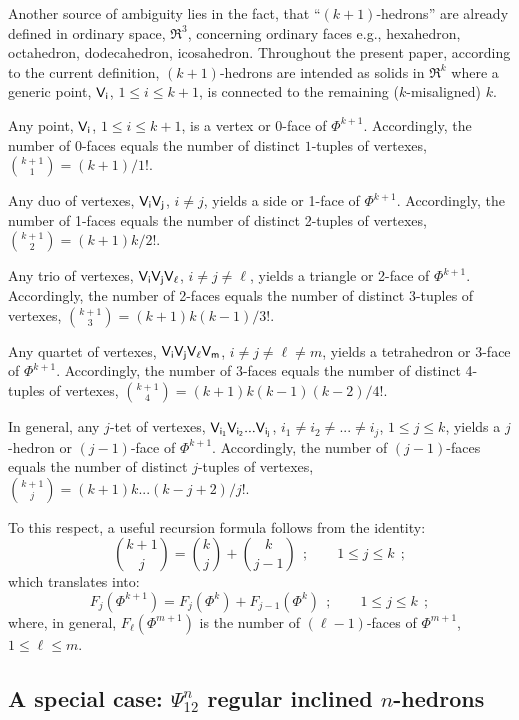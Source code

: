 \documentclass[12pt,a4paper]{article}
\begin{document}
Another source of ambiguity lies in the fact, that ``$(k+1)$-hedrons'' are
already defined in ordinary space, $\Re^3$, concerning ordinary faces e.g.,
hexahedron, octahedron, dodecahedron, icosahedron.   Throughout the present
paper, according to the current definition, $(k+1)$-hedrons are intended as
solids in $\Re^k$ where a generic point,  ${\sf V_i}$, $1\le i\le k+1$, is
connected to the remaining ($k$-misaligned) $k$.

Any point, ${\sf V_i}$, $1\le i\le k+1$, is a vertex or 0-face of
$\Phi^{k+1}$.   Accordingly, the number of $0$-faces equals
the number of distinct $1$-tuples of vertexes, ${k+1 \choose 1}=(k+1)/1!$.

Any duo of vertexes, ${\sf V_iV_j}$, $i\ne j$, yields a side or 1-face of
$\Phi^{k+1}$.   Accordingly, the number of 1-faces equals the number of
distinct 2-tuples of vertexes, ${k+1 \choose 2}=(k+1)k/2!$.

Any trio of vertexes, ${\sf V_iV_jV_\ell}$, $i\ne j\ne\ell$, yields a triangle
or 2-face of $\Phi^{k+1}$.   Accordingly, the number of 2-faces equals the
number of distinct 3-tuples of vertexes, ${k+1 \choose 3}=(k+1)k(k-1)/3!$.

Any quartet of vertexes, ${\sf V_iV_jV_\ell  V_m}$, $i\ne j\ne\ell\ne m$,
yields a tetrahedron or 3-face of $\Phi^{k+1}$.   Accordingly, the number of
3-faces equals the number of distinct 4-tuples of vertexes,
${k+1 \choose 4}=(k+1)k(k-1)(k-2)/4!$.

In general, any $j$-tet of vertexes, ${\sf V_{i_1}V_{i_2}...V_{i_j}}$,
$i_1\ne i_2\ne...\ne i_j$, $1\le j\le k$, yields a $j$-hedron or
$(j-1)$-face of $\Phi^{k+1}$.    Accordingly, the number of $(j-1)$-faces
equals the number of distinct $j$-tuples of vertexes,
${k+1 \choose j}=(k+1)k...(k-j+2)/j!$.

To this respect, a useful recursion formula follows from the identity:
\begin{equation}
\label{eq:focb}
{k+1 \choose j}={k \choose j}+{k \choose j-1}~~;\qquad1\le j\le k~~;
\end{equation}
which translates into:
\begin{equation}
\label{eq:fofa}
F_j(\Phi^{k+1})=F_j(\Phi^k)+F_{j-1}(\Phi^k)~~;\qquad1\le j\le k~~;
\end{equation}
where, in general, $F_\ell(\Phi^{m+1})$ is the number of $(\ell-1)$-faces of
$\Phi^{m+1}$, $1\le\ell\le m$.

\subsection{A special case: $\Psi_{12}^n$ regular inclined $n$-hedrons}
\label{a:psi12n}
\end{document}
